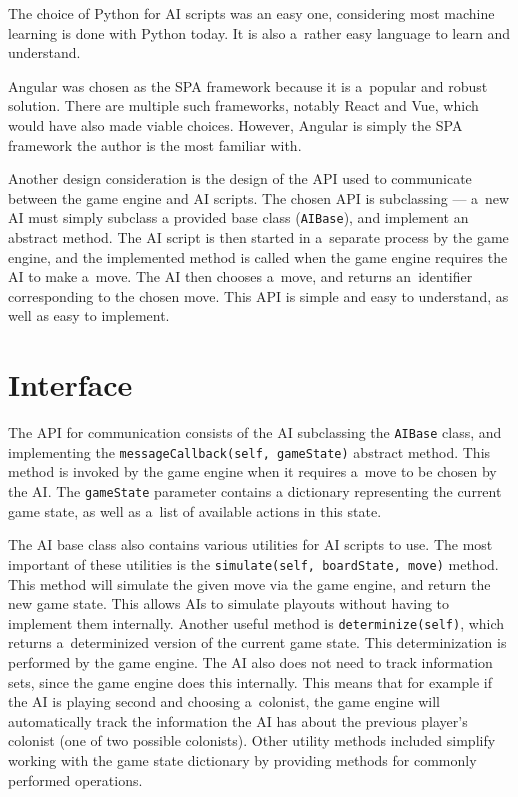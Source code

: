 The choice of Python for AI scripts was an easy one, considering most machine learning
is done with Python today. It is also a~rather easy language to learn and understand.

Angular was chosen as the SPA framework because it is a~popular and robust solution.
There are multiple such frameworks, notably React and Vue, which would have also
made viable choices. However, Angular is simply the SPA framework the author
is the most familiar with.

Another design consideration is the design of the API used to communicate between
the game engine and AI scripts. The chosen API is subclassing --- a~new AI
must simply subclass a provided base class (\texttt{AIBase}), and implement
an abstract method. The AI script is then started in a~separate process
by the game engine, and the implemented method is called when the game engine
requires the AI to make a~move. The AI then chooses a~move, and returns an~identifier
corresponding to the chosen move. This API is simple and easy to understand,
as well as easy to implement.

\section{Interface}

The API for communication consists of the AI subclassing the \texttt{AIBase} class,
and implementing the \texttt{messageCallback(self, gameState)} abstract method. This method
is invoked by the game engine when it requires a~move to be chosen by the AI. The
\texttt{gameState} parameter contains a dictionary representing the current game state,
as well as a~list of available actions in this state.

The AI base class also contains various utilities for AI scripts to use. The most
important of these utilities is the \texttt{simulate(self, boardState, move)} method.
This method will simulate the given move via the game engine, and return the new game state.
This allows AIs to simulate playouts without having to implement them internally.
Another useful method is \texttt{determinize(self)}, which returns a~determinized
version of the current game state. This determinization is performed by the game
engine. The AI also does not need to track information sets, since the game engine
does this internally. This means that for example if the AI is playing second and
choosing a~colonist, the game engine will automatically track the information the AI
has about the previous player's colonist (one of two possible colonists).
Other utility methods included simplify working with the game state dictionary by
providing methods for commonly performed operations.

